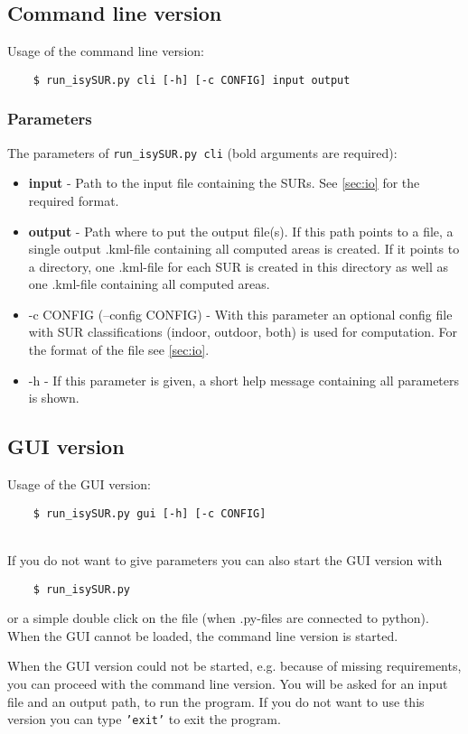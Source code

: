 \documentclass[11pt,fleqn]{book} %
\begin{document}
\subsection{Command line version}\label{sec:cli}
Usage of the command line version:
\begin{verbatim}
	$ run_isySUR.py cli [-h] [-c CONFIG] input output
\end{verbatim}

\subsubsection{Parameters}
The parameters of \texttt{run\_isySUR.py cli} (bold arguments are required):
\begin{itemize}
	\item \textbf{input} - Path to the input file containing the SURs. See \ref{sec:io} for the required format.
	\item \textbf{output} - Path where to put the output file(s). If this path points to a file, a single output .kml-file containing all computed areas is created. If it points to a directory, one .kml-file for each SUR is created in this directory as well as one .kml-file containing all computed areas.
	\item -c CONFIG (--config CONFIG) - With this parameter an optional config file with SUR classifications (indoor, outdoor, both) is used for computation. For the format of the file see \ref{sec:io}.
	\item -h - If this parameter is given, a short help message containing all parameters is shown.
\end{itemize}

\subsection{GUI version}\label{sec:gui}
Usage of the GUI version:
\begin{verbatim}
	$ run_isySUR.py gui [-h] [-c CONFIG]
\end{verbatim}
~\\
If you do not want to give parameters you can also start the GUI version with
\begin{verbatim}
	$ run_isySUR.py
\end{verbatim}
or a simple double click on the file (when .py-files are connected to python). When the GUI cannot be loaded, the command line version is started.

When the GUI version could not be started, e.g. because of missing requirements, you can proceed with the command line version. You will be asked for an input file and an output path, to run the program. If you do not want to use this version you can type \texttt{'exit'} to exit the program.
\end{document}
